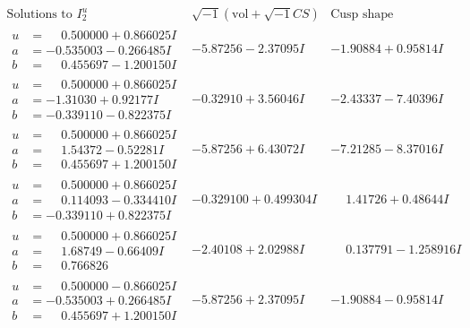 \documentclass[1p]{elsarticle_modified}
\theoremstyle{definition}
\newcommand{\I}{\sqrt{-1}}
\begin{document}
$$\begin{array}{c|c|c}  
\text{Solutions to }I^u_{2}& \I (\text{vol} + \sqrt{-1}CS) & \text{Cusp shape}\\
 \hline 
\begin{aligned}
u &= \phantom{-}0.500000 + 0.866025 I \\
a &= -0.535003 - 0.266485 I \\
b &= \phantom{-}0.455697 - 1.200150 I\end{aligned}
 & -5.87256 - 2.37095 I & -1.90884 + 0.95814 I \\ \hline\begin{aligned}
u &= \phantom{-}0.500000 + 0.866025 I \\
a &= -1.31030 + 0.92177 I \\
b &= -0.339110 - 0.822375 I\end{aligned}
 & -0.32910 + 3.56046 I & -2.43337 - 7.40396 I \\ \hline\begin{aligned}
u &= \phantom{-}0.500000 + 0.866025 I \\
a &= \phantom{-}1.54372 - 0.52281 I \\
b &= \phantom{-}0.455697 + 1.200150 I\end{aligned}
 & -5.87256 + 6.43072 I & -7.21285 - 8.37016 I \\ \hline\begin{aligned}
u &= \phantom{-}0.500000 + 0.866025 I \\
a &= \phantom{-}0.114093 - 0.334410 I \\
b &= -0.339110 + 0.822375 I\end{aligned}
 & -0.329100 + 0.499304 I & \phantom{-}1.41726 + 0.48644 I \\ \hline\begin{aligned}
u &= \phantom{-}0.500000 + 0.866025 I \\
a &= \phantom{-}1.68749 - 0.66409 I \\
b &= \phantom{-}0.766826\phantom{ +0.000000I}\end{aligned}
 & -2.40108 + 2.02988 I & \phantom{-}0.137791 - 1.258916 I \\ \hline\begin{aligned}
u &= \phantom{-}0.500000 - 0.866025 I \\
a &= -0.535003 + 0.266485 I \\
b &= \phantom{-}0.455697 + 1.200150 I\end{aligned}
 & -5.87256 + 2.37095 I & -1.90884 - 0.95814 I \\ \hline\begin{aligned}

\end{aligned}
\end{array}$$
\end{document}

